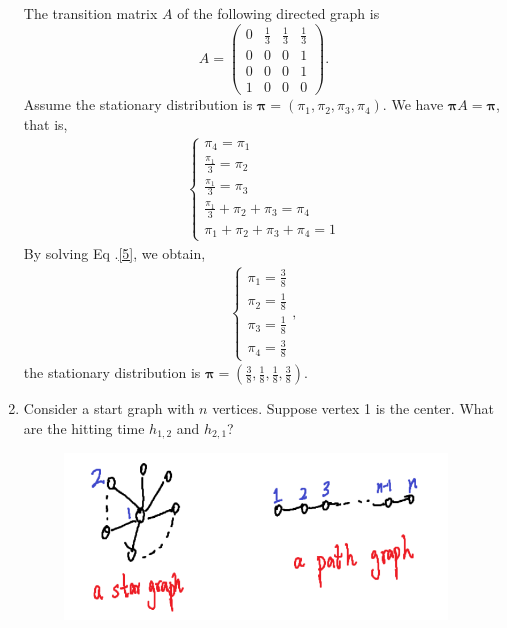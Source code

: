 \begin{problem}[30 points]
\begin{enumerate}
  \Answer
  The transition matrix $A$ of the following directed graph is 
  \begin{equation}
  A = {
\left( \begin{array}{cccc}
0 & \frac{1}{3} & \frac{1}{3} & \frac{1}{3}\\
0 & 0 & 0 & 1\\
0 & 0 & 0 & 1 \\
1 & 0 & 0 & 0 
\end{array}
\right )}.
  \end{equation}
 Assume the stationary distribution is $\mathbf{\pi} = (\pi_1, \pi_2, \pi_3, \pi_4)$. We have $\mathbf{\pi}A = \mathbf{\pi}$, that is,
\begin{align}\label{5}
\begin{cases}
\pi_4 = \pi_1\\
 \frac{\pi_1}{3} = \pi_2\\
  \frac{\pi_1}{3} = \pi_3\\
  \frac{\pi_1}{3}+\pi_2+\pi_3 = \pi_4\\
  \pi_1+ \pi_2+ \pi_3+ \pi_4 =1
\end{cases}
\end{align}
 By solving Eq .\eqref{5}, we obtain,
 \begin{align}
\begin{cases}
 \pi_1 = \frac{3}{8}\\
 \pi_2 = \frac{1}{8}\\
 \pi_3 = \frac{1}{8}\\
 \pi_4 = \frac{3}{8}
\end{cases},
\end{align}
the stationary distribution is $\mathbf{\pi} = (\frac{3}{8}, \frac{1}{8},\frac{1}{8}, \frac{3}{8})$.
      
  \item Consider a start graph with $n$ vertices. Suppose vertex 1 is the center. What are the hitting time $h_{1,2}$ and $h_{2,1}$?
   \begin{figure}[H]
      \centering
 \includegraphics[width=4in]{images/1234.png}
\end{figure} 
  

\end{enumerate}
\end{problem}
